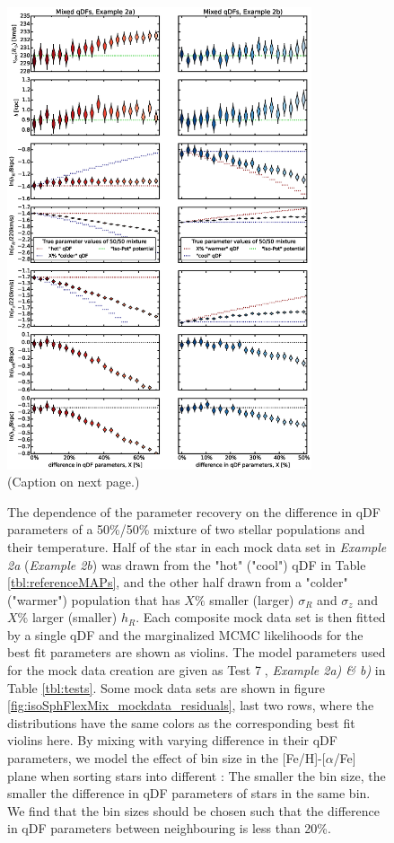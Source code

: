 
\begin{figure}
\centering
\includegraphics[width=0.8\textwidth]{figs/isoSphFlexMixDiff_violins.eps}
\caption{(Caption on next page.)}
\end{figure}


\addtocounter{figure}{-1}
\begin{figure} [t!]
\caption{The dependence of the parameter recovery on the difference in qDF parameters of a 50\%/50\% mixture of two stellar populations and their temperature. Half of the star in each mock data set in \emph{Example 2a} (\emph{Example 2b}) was drawn from the "hot" ("cool") qDF in Table \ref{tbl:referenceMAPs}, and the other half drawn from a "colder" ("warmer") population that has $X\%$ smaller (larger) $\sigma_R$ and $\sigma_z$ and $X\%$ larger (smaller) $h_R$. Each composite mock data set is then fitted by a single qDF and the marginalized MCMC likelihoods for the best fit parameters are shown as violins. The model parameters used for the mock data creation are given as Test \textcircled{7}, \emph{Example 2a) \& b)} in Table \ref{tbl:tests}. Some mock data sets are shown in figure \ref{fig:isoSphFlexMix_mockdata_residuals}, last two rows, where the distributions have the same colors as the corresponding best fit violins here. By mixing \MAPs with varying difference in their qDF parameters, we model the effect of bin size in the [Fe/H]-[$\alpha$/Fe] plane when sorting stars into different \MAPs: The smaller the bin size, the smaller the difference in qDF parameters of stars in the same bin. We find that the bin sizes should be chosen such that the difference in qDF parameters between neighbouring \MAPs is less than 20\%.} 
\label{fig:isoSphFlexMixDiff}
\end{figure}

